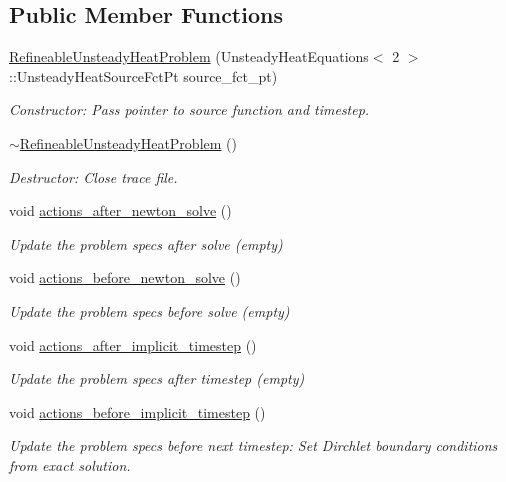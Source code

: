 \subsection*{Public Member Functions}
\begin{DoxyCompactItemize}
\item 
\hyperlink{classRefineableUnsteadyHeatProblem_a894f3bd6c1c23c307a736de6898e4e98}{Refineable\+Unsteady\+Heat\+Problem} (Unsteady\+Heat\+Equations$<$ 2 $>$\+::Unsteady\+Heat\+Source\+Fct\+Pt source\+\_\+fct\+\_\+pt)
\begin{DoxyCompactList}\small\item\em Constructor\+: Pass pointer to source function and timestep. \end{DoxyCompactList}\item 
\hyperlink{classRefineableUnsteadyHeatProblem_a975e00f5e87d77b4e1bf4d50482dea2b}{$\sim$\+Refineable\+Unsteady\+Heat\+Problem} ()
\begin{DoxyCompactList}\small\item\em Destructor\+: Close trace file. \end{DoxyCompactList}\item 
void \hyperlink{classRefineableUnsteadyHeatProblem_ada522772b79e92a75edf3724d0a273da}{actions\+\_\+after\+\_\+newton\+\_\+solve} ()
\begin{DoxyCompactList}\small\item\em Update the problem specs after solve (empty) \end{DoxyCompactList}\item 
void \hyperlink{classRefineableUnsteadyHeatProblem_aac1935e15c67b196e6db97dd058511b5}{actions\+\_\+before\+\_\+newton\+\_\+solve} ()
\begin{DoxyCompactList}\small\item\em Update the problem specs before solve (empty) \end{DoxyCompactList}\item 
void \hyperlink{classRefineableUnsteadyHeatProblem_aa740f2eb1b3909100a04709b401c0b41}{actions\+\_\+after\+\_\+implicit\+\_\+timestep} ()
\begin{DoxyCompactList}\small\item\em Update the problem specs after timestep (empty) \end{DoxyCompactList}\item 
void \hyperlink{classRefineableUnsteadyHeatProblem_ac754f1313cd6d684c149443beb5bcf9e}{actions\+\_\+before\+\_\+implicit\+\_\+timestep} ()
\begin{DoxyCompactList}\small\item\em Update the problem specs before next timestep\+: Set Dirchlet boundary conditions from exact solution. \end{DoxyCompactList}\item 

\end{DoxyCompactItemize}

